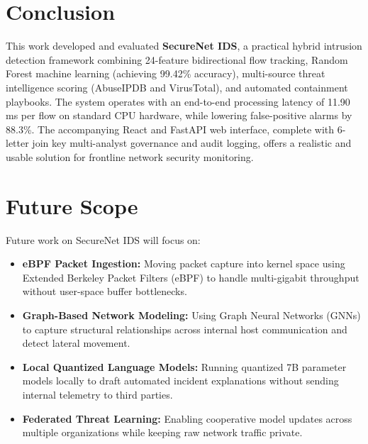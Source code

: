 \documentclass[conference]{IEEEtran}
\begin{document}
\section{Conclusion}
This work developed and evaluated \textbf{SecureNet IDS}, a practical hybrid intrusion detection framework combining 24-feature bidirectional flow tracking, Random Forest machine learning (achieving 99.42\% accuracy), multi-source threat intelligence scoring (AbuseIPDB and VirusTotal), and automated containment playbooks. The system operates with an end-to-end processing latency of 11.90 ms per flow on standard CPU hardware, while lowering false-positive alarms by 88.3\%. The accompanying React and FastAPI web interface, complete with 6-letter join key multi-analyst governance and audit logging, offers a realistic and usable solution for frontline network security monitoring.

\section{Future Scope}
Future work on SecureNet IDS will focus on:
\begin{itemize}
    \item \textbf{eBPF Packet Ingestion:} Moving packet capture into kernel space using Extended Berkeley Packet Filters (eBPF) to handle multi-gigabit throughput without user-space buffer bottlenecks.
    \item \textbf{Graph-Based Network Modeling:} Using Graph Neural Networks (GNNs) to capture structural relationships across internal host communication and detect lateral movement.
    \item \textbf{Local Quantized Language Models:} Running quantized 7B parameter models locally to draft automated incident explanations without sending internal telemetry to third parties.
    \item \textbf{Federated Threat Learning:} Enabling cooperative model updates across multiple organizations while keeping raw network traffic private.
\end{itemize}
\end{document}
